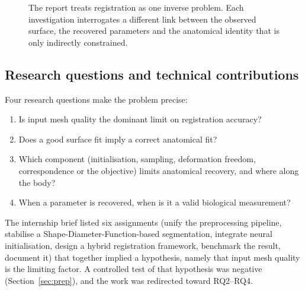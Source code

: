 \begin{figure}[!htb]
\centering
{}
\caption[One inverse problem, several investigations]{The report treats
registration as one inverse problem. Each investigation interrogates a
different link between the observed surface, the recovered parameters and the
anatomical identity that is only indirectly constrained.}
\label{fig:map}
\end{figure}

\subsection{Research questions and technical contributions}

Four research questions make the problem precise:
\begin{enumerate}[label=\textbf{RQ\arabic*.}]
\item Is input mesh quality the dominant limit on registration accuracy?
\item Does a good surface fit imply a correct anatomical fit?
\item Which component (initialisation, sampling, deformation freedom,
correspondence or the objective) limits anatomical recovery, and where along
the body?
\item When a parameter is recovered, when is it a valid biological
measurement?
\end{enumerate}
The internship brief listed six assignments (unify the preprocessing pipeline,
stabilise a Shape-Diameter-Function-based segmentation, integrate neural
initialisation, design a hybrid registration framework, benchmark the result,
document it) that together implied a hypothesis, namely that input mesh quality
is the limiting factor. A controlled test of that hypothesis was negative
(Section~\ref{sec:prep}), and the work was redirected toward RQ2--RQ4.

